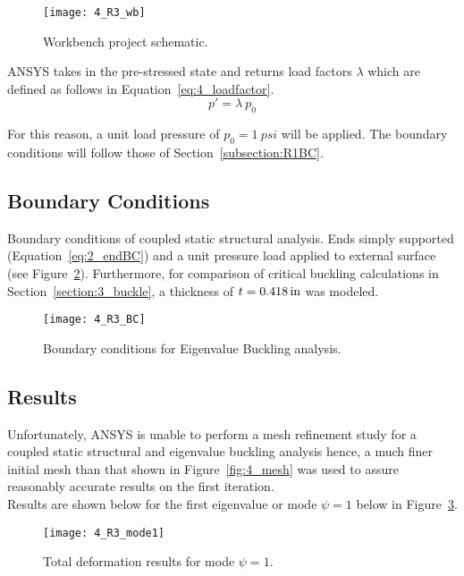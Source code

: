 \begin{figure}[H]
	\centering
	\texttt{[image: 4\_R3\_wb]}
	\caption{Workbench project schematic.}
	\label{fig:4_R3_wb}
\end{figure}

ANSYS takes in the pre-stressed state and returns load factors $\lambda$ which are defined as follows in Equation~\ref{eq:4_loadfactor}.
\begin{equation}
	\label{eq:4_loadfactor}
	p' = \lambda \ p_0
\end{equation}

For this reason, a unit load pressure of $p_0 = 1\ psi$ will be applied. The boundary conditions will follow those of Section~\ref{subsection:R1BC}.

\subsection{Boundary Conditions}

Boundary conditions of coupled static structural analysis. Ends simply supported (Equation~\ref{eq:2_endBC}) and a unit pressure load applied to external surface (see Figure~\ref{fig:4_R3_BC}). Furthermore, for comparison of critical buckling calculations in Section~\ref{section:3_buckle}, a thickness of $t=0.418\,\mathrm{in}$ was modeled. 

\begin{figure}[H]
	\centering
	\texttt{[image: 4\_R3\_BC]}
	\caption{Boundary conditions for Eigenvalue Buckling analysis.}
	\label{fig:4_R3_BC}
\end{figure}

\subsection{Results}

Unfortunately, ANSYS is unable to perform a mesh refinement study for a coupled static structural and eigenvalue buckling analysis hence, a much finer initial mesh than that shown in Figure~\ref{fig:4_mesh} was used to assure reasonably accurate results on the first iteration.\\

Results are shown below for the first eigenvalue or mode $\psi = 1$ below in Figure~\ref{fig:4_R3_mode1}.
\begin{figure}[H]
	\centering
	\texttt{[image: 4\_R3\_mode1]}
	\caption{Total deformation results for mode $\psi = 1$.}
	\label{fig:4_R3_mode1}
\end{figure}

